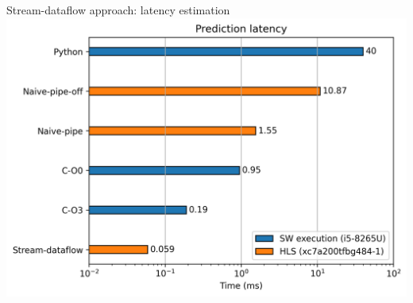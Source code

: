 \documentclass[xcolor=table]{beamer}
\begin{document}
\begin{frame}{Stream-dataflow approach: latency estimation}
  \centering
  \includegraphics[scale=0.65]{Images/final-plot.png}
\end{frame}
\end{document}
